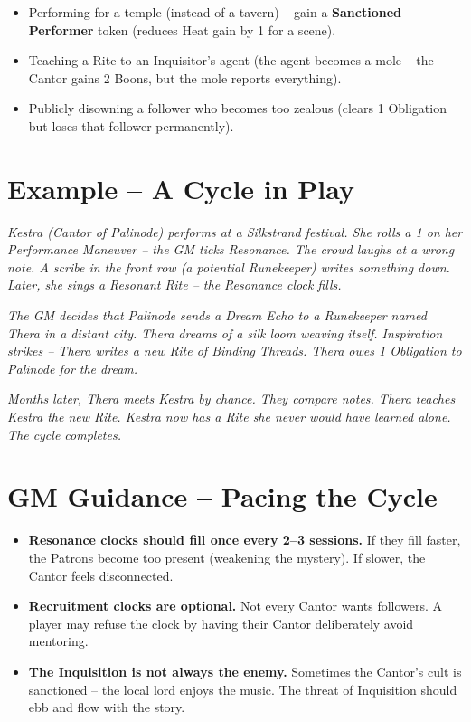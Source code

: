 \documentclass[10pt,a5paper]{book}
\begin{document}
\begin{itemize}
    \item Performing for a temple (instead of a tavern) – gain a \textbf{Sanctioned Performer} token (reduces Heat gain by 1 for a scene).
    \item Teaching a Rite to an Inquisitor’s agent (the agent becomes a mole – the Cantor gains 2 Boons, but the mole reports everything).
    \item Publicly disowning a follower who becomes too zealous (clears 1 Obligation but loses that follower permanently).
\end{itemize}

\section{Example – A Cycle in Play}

\textit{Kestra (Cantor of Palinode) performs at a Silkstrand festival. She rolls a 1 on her Performance Maneuver – the GM ticks Resonance. The crowd laughs at a wrong note. A scribe in the front row (a potential Runekeeper) writes something down. Later, she sings a Resonant Rite – the Resonance clock fills.}

\textit{The GM decides that Palinode sends a Dream Echo to a Runekeeper named Thera in a distant city. Thera dreams of a silk loom weaving itself. Inspiration strikes – Thera writes a new Rite of Binding Threads. Thera owes 1 Obligation to Palinode for the dream.}

\textit{Months later, Thera meets Kestra by chance. They compare notes. Thera teaches Kestra the new Rite. Kestra now has a Rite she never would have learned alone. The cycle completes.}

\section{GM Guidance – Pacing the Cycle}

\begin{itemize}
    \item \textbf{Resonance clocks should fill once every 2–3 sessions.} If they fill faster, the Patrons become too present (weakening the mystery). If slower, the Cantor feels disconnected.
    \item \textbf{Recruitment clocks are optional.} Not every Cantor wants followers. A player may refuse the clock by having their Cantor deliberately avoid mentoring.
    \item \textbf{The Inquisition is not always the enemy.} Sometimes the Cantor’s cult is sanctioned – the local lord enjoys the music. The threat of Inquisition should ebb and flow with the story.
\end{itemize}
\end{document}

